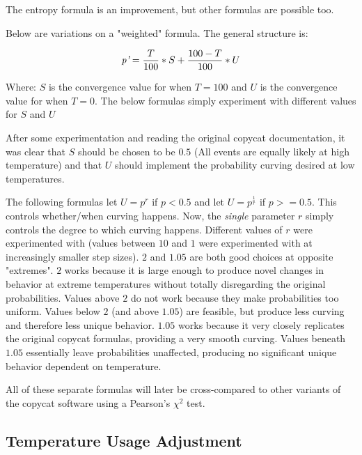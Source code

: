 \documentclass[a4paper]{article}
\begin{document}
        The entropy formula is an improvement, but other formulas are possible too.

        Below are variations on a "weighted" formula.
        The general structure is:

        \[\emph{p'} = \frac{T}{100} * S + \frac{100-T}{100} * U\]

        Where: $S$ is the convergence value for when $T = 100$ and
               $U$ is the convergence value for when $T = 0$.
        The below formulas simply experiment with different values for $S$ and $U$

        

        After some experimentation and reading the original copycat documentation, it was clear that $S$ should be chosen to be $0.5$ (All events are equally likely at high temperature) and that $U$ should implement the probability curving desired at low temperatures. 

        The following formulas let $U = p^r$ if $p < 0.5$ and let $U = p^\frac{1}{r}$ if $p >= 0.5$.
        This controls whether/when curving happens.
        Now, the \emph{single} parameter $r$ simply controls the degree to which curving happens.
        Different values of $r$ were experimented with (values between $10$ and $1$ were experimented with at increasingly smaller step sizes).
        $2$ and $1.05$ are both good choices at  opposite "extremes".
        $2$ works because it is large enough to produce novel changes in behavior at extreme temperatures without totally disregarding the original probabilities.
        Values above $2$ do not work because they make probabilities too uniform.
        Values below $2$ (and above $1.05$) are feasible, but produce less curving and therefore less unique behavior.
        $1.05$ works because it very closely replicates the original copycat formulas, providing a very smooth curving.
        Values beneath $1.05$ essentially leave probabilities unaffected, producing no significant unique behavior dependent on temperature.

        

        All of these separate formulas will later be cross-compared to other variants of the copycat software using a Pearson's $\chi^2$ test.

    \subsection{Temperature Usage Adjustment}
\end{document}
